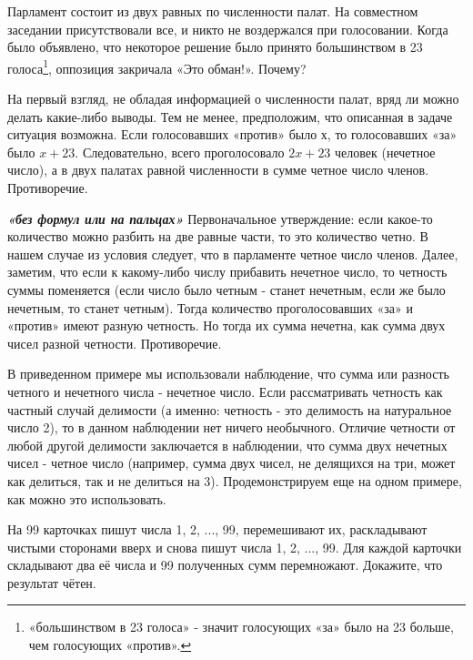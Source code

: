 \begin{thm}
	Парламент состоит из двух равных по численности палат. На совместном заседании присутствовали все, и никто не воздержался при голосовании. Когда было объявлено, что некоторое решение было принято большинством в 23 голоса\footnote{«большинством в 23 голоса» - значит голосующих «за» было на 23 больше, чем голосующих «против».},  оппозиция закричала «Это обман!». Почему?
\end{thm}

\begin{prf}
	На первый взгляд, не обладая информацией о численности палат, вряд ли можно делать какие-либо выводы. Тем не менее, предположим, что описанная в задаче ситуация возможна. Если голосовавших «против» было х, то голосовавших «за» было $x + 23$. Следовательно, всего проголосовало $2x + 23$ человек (нечетное число), а в двух палатах равной численности в сумме четное число членов. Противоречие.
\end{prf}
\begin{prf}
\textit{\textbf{«без формул или на пальцах»}} Первоначальное утверждение: если какое-то количество можно разбить на две равные части, то это количество четно. В нашем случае из условия следует, что в парламенте четное число членов. Далее, заметим, что если к какому-либо числу прибавить нечетное число, то четность суммы поменяется (если число было четным - станет нечетным, если же было нечетным, то станет четным). Тогда количество проголосовавших «за» и «против» имеют разную четность. Но тогда их сумма нечетна, как сумма двух чисел разной четности. Противоречие.
\end{prf}
\vfill
В приведенном примере мы использовали наблюдение, что сумма или разность четного и нечетного числа - нечетное число. Если рассматривать четность как частный случай делимости (а именно: четность - это делимость на натуральное число 2), то в данном наблюдении нет ничего необычного. Отличие четности от любой другой делимости заключается в наблюдении, что сумма двух нечетных чисел - четное число (например, сумма двух чисел, не делящихся на три, может как делиться, так и не делиться на 3). Продемонстрируем еще на одном примере, как можно это использовать.

\begin{thm}
	На 99 карточках пишут числа 1, 2, ..., 99, перемешивают их, раскладывают чистыми сторонами вверх и снова пишут числа 1, 2, ..., 99. Для каждой карточки складывают два её числа и 99 полученных сумм перемножают. Докажите, что результат чётен.
\end{thm}

